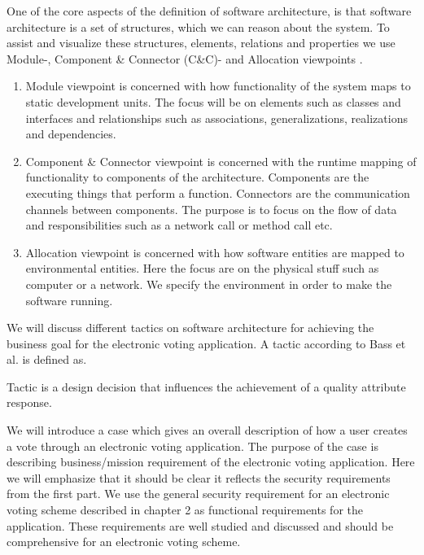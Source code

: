 \noindent
One of the core aspects of the definition of software architecture, is that software architecture is a set of structures, which we can reason about the system. To assist and visualize these structures, elements, relations and properties we use Module-, Component \& Connector (C\&C)- and Allocation viewpoints \cite{3+1}. 

\begin{enumerate}
    \item Module viewpoint is concerned with how functionality of the system maps to static development units. The focus will be on elements such as classes and interfaces and relationships such as associations, generalizations, realizations and dependencies.
    \item Component \& Connector viewpoint is concerned with the runtime mapping of functionality to components of the architecture. Components are the executing things that perform a function. Connectors are the communication channels between components. The purpose is to focus on the flow of data and responsibilities such as a network call or method call etc.
    \item Allocation viewpoint is concerned with how software entities are mapped to environmental entities. Here the focus are on the physical stuff such as computer or a network. We specify the environment in order to make the software running. 
\end{enumerate}

\noindent
We will discuss different tactics on software architecture for achieving the business goal for the electronic voting application. A tactic according to Bass et al. is defined as.

\begin{defi}
Tactic is a design decision that influences the achievement of a quality attribute response. \cite{Bass}
\end{defi}

\noindent
We will introduce a case which gives an overall description of how a user creates a vote through an electronic voting application. The purpose of the case is describing business/mission requirement of the electronic voting application. Here we will emphasize that it should be clear it reflects the security requirements from the first part. We use the general security requirement for an electronic voting scheme described in chapter 2 as functional requirements for the application. These requirements are well studied and discussed and should be comprehensive for an electronic voting scheme.
